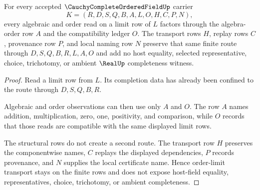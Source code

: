 \begin{theorem}
\label{thm:cauchy-complete-ordered-field-order-limit-transport}
For every accepted $\CauchyCompleteOrderedFieldUp$ carrier
$$
K=(R,D,S,Q,B,A,L,O,H,C,P,N),
$$
every algebraic and order read on a limit row of $L$ factors through the algebra-order row $A$ and the compatibility ledger $O$. The transport rows $H$, replay rows $C$, provenance row $P$, and local naming row $N$ preserve that same finite route through $D,S,Q,B,R,L,A,O$ and add no host equality, selected representative, choice, trichotomy, or ambient $\RealUp$ completeness witness.
\end{theorem}
\begin{proof}
Read a limit row from $L$. Its completion data has already been confined to the route through $D,S,Q,B,R$.

Algebraic and order observations can then use only $A$ and $O$. The row $A$ names addition, multiplication, zero, one, positivity, and comparison, while $O$ records that those reads are compatible with the same displayed limit rows.

The structural rows do not create a second route. The transport row $H$ preserves the componentwise names, $C$ replays the displayed dependencies, $P$ records provenance, and $N$ supplies the local certificate name. Hence order-limit transport stays on the finite rows and does not expose host-field equality, representatives, choice, trichotomy, or ambient completeness.
\end{proof}

